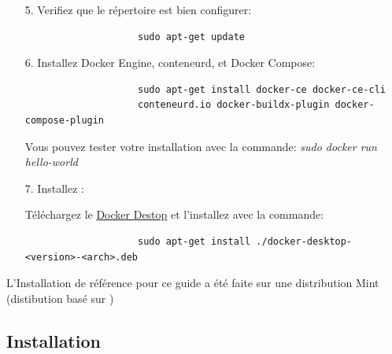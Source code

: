 \documentclass[internal]{nhitec_design}
\begin{document}
\begin{itemize}
            \item[5.] Verifiez que le répertoire est bien configurer:

                \begin{lstlisting}
                    sudo apt-get update
                \end{lstlisting}    

            \item[6.] Installez Docker Engine, conteneurd, et Docker Compose:

                \begin{lstlisting}
                    sudo apt-get install docker-ce docker-ce-cli 
                    conteneurd.io docker-buildx-plugin docker-compose-plugin
                \end{lstlisting}
                \begin{footnotesize}
                    Vous pouvez tester votre installation avec la commande: \textit{sudo docker run hello-world}
                \end{footnotesize}

                \bigskip
            \item[7.] Installez \dockerdesktop{}:

            
                \begin{footnotesize}
                    Téléchargez le \href{https://desktop.docker.com/linux/main/amd64/docker-desktop-4.17.0-amd64.deb?utm_source=docker&utm_medium=webreferral&utm_campaign=docs-driven-download-linux-amd64}{Docker Destop} et l'installez avec la commande:
                \end{footnotesize}

                \begin{lstlisting}
                    sudo apt-get install ./docker-desktop-<version>-<arch>.deb
                \end{lstlisting}

        \end{itemize}

\bigskip

        \begin{footnotesize}
            L'Installation de référence pour ce guide a été faite sur une distribution \linux{} Mint (distibution basé sur \ubuntu{})\\
        \end{footnotesize}

\newpage

    \subsection[Installation Windows]{Installation \windows{}}
\end{document}
